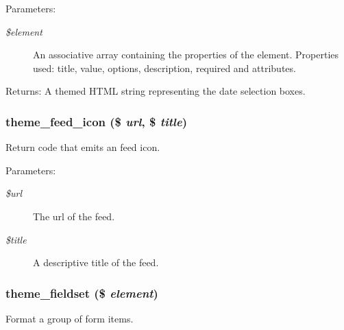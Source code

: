 \begin{Desc}
\item[Parameters:]
\begin{description}
\item[{\em \$element}]An associative array containing the properties of the element. Properties used: title, value, options, description, required and attributes. \end{description}
\end{Desc}
\begin{Desc}
\item[Returns:]A themed HTML string representing the date selection boxes. \end{Desc}
\hypertarget{group__themeable_ge5d10f67376dfa4cd18256bf1d496169}{
\subsubsection[{theme\_\-feed\_\-icon}]{\setlength{\rightskip}{0pt plus 5cm}theme\_\-feed\_\-icon (\$ {\em url}, \/  \$ {\em title})}}
\label{group__themeable_ge5d10f67376dfa4cd18256bf1d496169}


Return code that emits an feed icon.

\begin{Desc}
\item[Parameters:]
\begin{description}
\item[{\em \$url}]The url of the feed. \item[{\em \$title}]A descriptive title of the feed. \end{description}
\end{Desc}
\hypertarget{group__themeable_g32be85aae1eb7b600c464065d437f44a}{
\subsubsection[{theme\_\-fieldset}]{\setlength{\rightskip}{0pt plus 5cm}theme\_\-fieldset (\$ {\em element})}}
\label{group__themeable_g32be85aae1eb7b600c464065d437f44a}


Format a group of form items.

